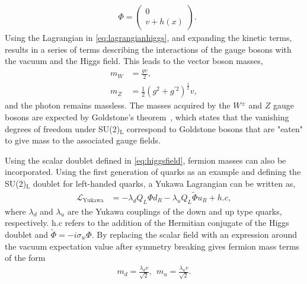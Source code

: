 \begin{equation}\renewcommand*{\arraystretch}{\newarraystrech}
    \label{eq:higgsfield}
    \begin{aligned}
        & \Phi = 
        \begin{pmatrix}
            0\\
            v + h(x)
        \end{pmatrix}.
     \end{aligned}
\end{equation}
Using the Lagrangian in \cref{eq:lagrangianhiggs}, and expanding the kinetic terms, results in a series of terms describing the interactions of the gauge bosons with the vacuum and the Higgs field. This leads to the vector boson masses, 
\begin{equation}
    \label{eq:bosonmasses}
    \begin{aligned}
        m_W &= \frac{gv}{2},\\
        m_Z &= \frac{1}{2}(g^2 + g^{\prime 2})^{\frac{1}{2}}v,
     \end{aligned}
\end{equation}
and the photon remains massless. The masses acquired by the $W^\pm$ and $Z$ gauge bosons are expected by Goldstone's theorem~\cite{PhysRev.127.965}, which states that the vanishing degrees of freedom under SU(2)$_\mathrm{L}$ correspond to Goldstone bosons that are "eaten" to give mass to the associated gauge fields. 

Using the scalar doublet defined in \cref{eq:higgsfield}, fermion masses can also be incorporated. Using the first generation of quarks as an example and defining the SU(2)$_\mathrm{L}$ doublet for left-handed quarks, a Yukawa Lagrangian can be written as, 
\begin{equation}
    \label{eq:YukawaLagrangian}
    \begin{aligned}
        \mathcal{L}_\mathrm{Yukawa} &= -\lambda_d Q_L \Phi d_R - \lambda_u Q_L \tilde{\Phi}u_R + h.c,
     \end{aligned}
\end{equation}
where $\lambda_{d}$ and $\lambda_u$ are the Yukawa couplings of the down and up type quarks, respectively. h.c refers to the addition of the Hermitian conjugate of the Higgs doublet and $\tilde{\Phi} = -i\sigma_w\Phi$. By replacing the scalar field with an expression around the vacuum expectation value after symmetry breaking gives fermion mass terms of the form
\begin{equation}
    \label{eq:fermionmass}
    \begin{aligned}
        m_d = \frac{\lambda_d v}{\sqrt{2}},~~m_u = \frac{\lambda_u v}{\sqrt{2}}.
     \end{aligned}
\end{equation}

